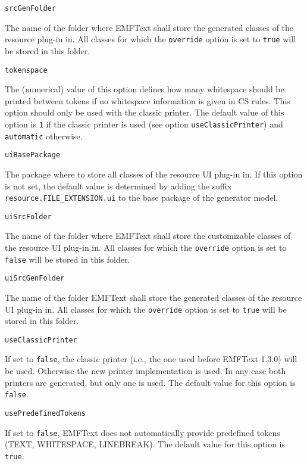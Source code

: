 \noindent\texttt{srcGenFolder}
\begin{myindentpar}{1cm}
The name of the folder where EMFText shall store the generated classes of the resource plug-in in. All classes for which the \texttt{override} option is set to \texttt{true} will be stored in this folder.
\end{myindentpar}

\noindent\texttt{tokenspace}
\begin{myindentpar}{1cm}
The (numerical) value of this option defines how many whitespace should be printed between tokens if no whitespace information is given in CS rules. This option should only be used with the classic printer. The default value of this option is \texttt{1} if the classic printer is used (see option \texttt{useClassicPrinter}) and \texttt{automatic} otherwise.
\end{myindentpar}

\noindent\texttt{uiBasePackage}
\begin{myindentpar}{1cm}
The package where to store all classes of the resource UI plug-in in. If this option is not set, the default value is determined by adding the suffix \texttt{resource.FILE\_EXTENSION.ui} to the base package of the generator model.
\end{myindentpar}

\noindent\texttt{uiSrcFolder}
\begin{myindentpar}{1cm}
The name of the folder where EMFText shall store the customizable classes of the resource UI plug-in in. All classes for which the \texttt{override} option is set to \texttt{false} will be stored in this folder.
\end{myindentpar}

\noindent\texttt{uiSrcGenFolder}
\begin{myindentpar}{1cm}
The name of the folder EMFText shall store the generated classes of the resource UI plug-in in. All classes for which the \texttt{override} option is set to \texttt{true} will be stored in this folder.
\end{myindentpar}

\noindent\texttt{useClassicPrinter}
\begin{myindentpar}{1cm}
If set to \texttt{false}, the classic printer (i.e., the one used before EMFText 1.3.0) will be used. Otherwise the new printer implementation is used. In any case both printers are generated, but only one is used. The default value for this option is \texttt{false}.
\end{myindentpar}

\noindent\texttt{usePredefinedTokens}
\begin{myindentpar}{1cm}
If set to \texttt{false}, EMFText does not automatically provide predefined tokens (TEXT, WHITESPACE, LINEBREAK). The default value for this option is \texttt{true}.
\end{myindentpar}

